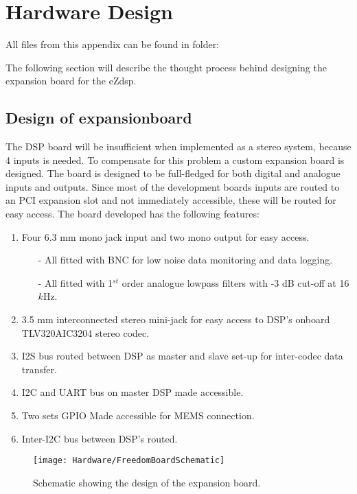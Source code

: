 \section{Hardware Design}

All files from this appendix can be found in folder: \\

The following section will describe the thought process behind designing the expansion board for the eZdsp. 


\subsection{Design of expansionboard}\label{subsec:DesignOfExpansion}

The DSP board will be insufficient when implemented as a stereo system, because 4 inputs is needed. To compensate for this problem a custom expansion board is designed. The board is designed to be full-fledged for both digital and analogue inputs and outputs. Since most of the development boards inputs are routed to an PCI expansion slot and not immediately accessible, these will be routed for easy access. The board developed has the following features:

\begin{enumerate}
	\item Four 6.3 mm mono jack input and two mono output for easy access.
	\begin{itemize}
		\item[-] All fitted with BNC for low noise data monitoring and data logging.
		\item[-] All fitted with 1$^{st}$ order analogue lowpass filters with -3 dB cut-off at 16 $k$Hz.
	\end{itemize}
	\item 3.5 mm interconnected stereo mini-jack for easy access to DSP's onboard TLV320AIC3204 stereo codec.
	\item I2S bus routed between DSP as master and slave set-up for inter-codec data transfer.
	\item I2C and UART bus on master DSP made accessible.
	\item Two sets GPIO Made accessible for MEMS connection.
	\item Inter-I2C bus between DSP's routed. 
\end{enumerate}


\begin{figure}[H]
	\centering
	\texttt{[image: Hardware/FreedomBoardSchematic]}	
	\caption{Schematic showing the design of the expansion board.}
	\label{fig:PCBboardSchem}
\end{figure}


